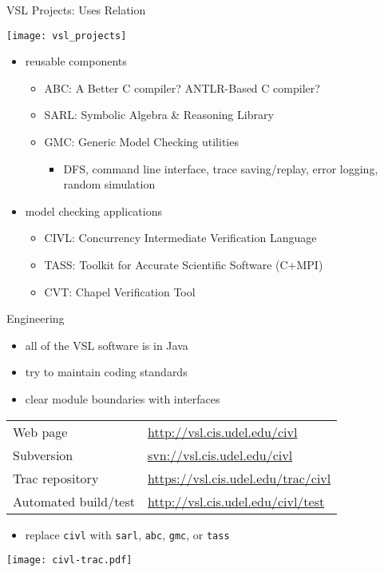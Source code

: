\documentclass[t]{beamer}
\begin{document}
\begin{frame}{VSL Projects: Uses Relation}

  \texttt{[image: vsl\_projects]}

  \begin{itemize}
  \item reusable components
    \begin{itemize}
    \item ABC: A Better C compiler?  ANTLR-Based C compiler?
    \item SARL: Symbolic Algebra \& Reasoning Library
    \item GMC: Generic Model Checking utilities
      \begin{itemize}
      \item DFS, command line interface, trace saving/replay, error
        logging, random simulation
      \end{itemize}
    \end{itemize}
  \item model checking applications
    \begin{itemize}
    \item CIVL: Concurrency Intermediate Verification Language
    \item TASS: Toolkit for Accurate Scientific Software (C+MPI)
    \item CVT: Chapel Verification Tool
    \end{itemize}
  \end{itemize}

\end{frame}

\begin{frame}{Engineering}

  \begin{itemize}
  \item all of the VSL software is in Java
  \item try to maintain coding standards
  \item clear module boundaries with interfaces
  \end{itemize}
  
  
  \begin{center}
    \begin{tabular}{|ll|}
      \hline
      Web page & \url{http://vsl.cis.udel.edu/civl}\\
      Subversion & \url{svn://vsl.cis.udel.edu/civl}\\
      Trac repository & \url{https://vsl.cis.udel.edu/trac/civl}\\
      Automated build/test & \url{http://vsl.cis.udel.edu/civl/test}\\
      \hline
    \end{tabular}
  \end{center}

  \begin{itemize}
  \item replace \texttt{civl} with \texttt{sarl}, \texttt{abc}, \texttt{gmc}, or
    \texttt{tass}
  \end{itemize}

  \texttt{[image: civl-trac.pdf]}
  
\end{frame}
\end{document}
